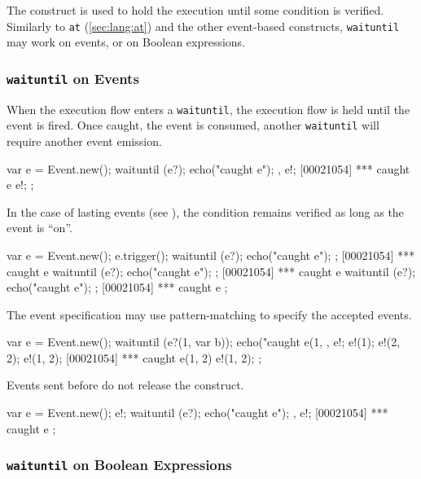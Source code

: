 The  construct is used to hold the execution until some
condition is verified.  Similarly to \lstinline{at} (\autoref{sec:lang:at})
and the other event-based constructs, \lstinline{waituntil} may work on
events, or on Boolean expressions.

\subsubsection{\lstinline{waituntil} on Events}

When the execution flow enters a \lstinline{waituntil}, the execution
flow is held until the event is fired.  Once caught, the event is
consumed, another \lstinline{waituntil} will require another event
emission.

\begin{urbiscript}
{
  var e = Event.new();
  {
    waituntil (e?);
    echo("caught e");
  },
  e!;
[00021054] *** caught e
  e!;
};
\end{urbiscript}

In the case of lasting events (see ), the
condition remains verified as long as the event is ``on''.

\begin{urbiscript}
{
  var e = Event.new();
  e.trigger();
  {
    waituntil (e?);
    echo("caught e");
  };
[00021054] *** caught e
  {
    waituntil (e?);
    echo("caught e");
  };
[00021054] *** caught e
  {
    waituntil (e?);
    echo("caught e");
  };
[00021054] *** caught e
};
\end{urbiscript}

The event specification may use pattern-matching to specify the
accepted events.

\begin{urbiscript}
{
  var e = Event.new();
  {
    waituntil (e?(1, var b));
    echo("caught e(1, %
  },
  e!;
  e!(1);
  e!(2, 2);
  e!(1, 2);
[00021054] *** caught e(1, 2)
  e!(1, 2);
};
\end{urbiscript}

Events sent before do not release the construct.

\begin{urbiscript}
{
  var e = Event.new();
  e!;
  {
    waituntil (e?);
    echo("caught e");
  },
  e!;
[00021054] *** caught e
};
\end{urbiscript}

\subsubsection{\lstinline{waituntil} on Boolean Expressions}

